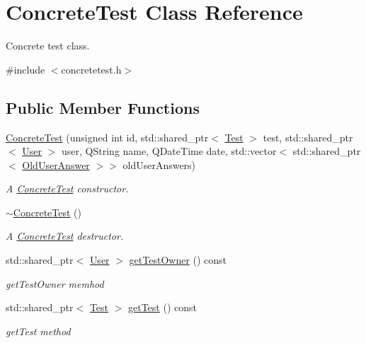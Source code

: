 \hypertarget{class_concrete_test}{}\section{Concrete\+Test Class Reference}
\label{class_concrete_test}


Concrete test class.  




{\ttfamily \#include $<$concretetest.\+h$>$}

\subsection*{Public Member Functions}
\begin{DoxyCompactItemize}
\item 
\hyperlink{class_concrete_test_a2604f3d0a17c6673b906d8e89f9ddbd6}{Concrete\+Test} (unsigned int id, std\+::shared\+\_\+ptr$<$ \hyperlink{class_test}{Test} $>$ test, std\+::shared\+\_\+ptr$<$ \hyperlink{class_user}{User} $>$ user, Q\+String name, Q\+Date\+Time date, std\+::vector$<$ std\+::shared\+\_\+ptr$<$ \hyperlink{class_old_user_answer}{Old\+User\+Answer} $>$$>$ old\+User\+Answers)
\begin{DoxyCompactList}\small\item\em A \hyperlink{class_concrete_test}{Concrete\+Test} constructor. \end{DoxyCompactList}\item 
\hyperlink{class_concrete_test_ac87522c67935f77fd3484646b7759c70}{$\sim$\+Concrete\+Test} ()
\begin{DoxyCompactList}\small\item\em A \hyperlink{class_concrete_test}{Concrete\+Test} destructor. \end{DoxyCompactList}\item 
std\+::shared\+\_\+ptr$<$ \hyperlink{class_user}{User} $>$ \hyperlink{class_concrete_test_a09e88f4984fed654de6f469515a26bcf}{get\+Test\+Owner} () const
\begin{DoxyCompactList}\small\item\em get\+Test\+Owner memhod \end{DoxyCompactList}\item 
std\+::shared\+\_\+ptr$<$ \hyperlink{class_test}{Test} $>$ \hyperlink{class_concrete_test_a1cd1879a0356b614266e5cd7bcbe4ff4}{get\+Test} () const
\begin{DoxyCompactList}\small\item\em get\+Test method \end{DoxyCompactList}\item 
$$
\end{DoxyCompactItemize}
